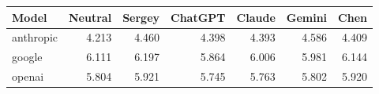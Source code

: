 \begin{tabular}{lrrrrrr}
\toprule
Model & Neutral & Sergey & ChatGPT & Claude & Gemini & Chen \\
\midrule
anthropic & 4.213 & 4.460 & 4.398 & 4.393 & 4.586 & 4.409 \\
google & 6.111 & 6.197 & 5.864 & 6.006 & 5.981 & 6.144 \\
openai & 5.804 & 5.921 & 5.745 & 5.763 & 5.802 & 5.920 \\
\bottomrule
\end{tabular}
